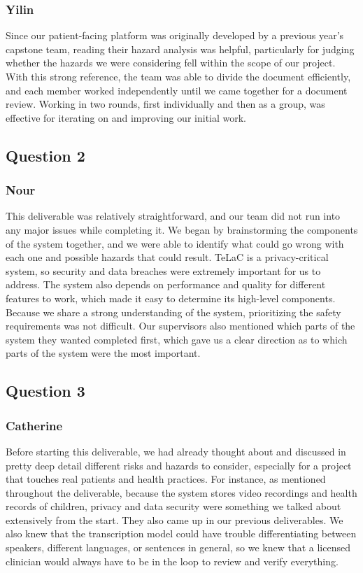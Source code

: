 \documentclass{article}
\begin{document}
\subsubsection*{Yilin}
Since our patient-facing platform was originally developed by a previous year’s capstone team, 
reading their hazard analysis was helpful, particularly for judging whether the hazards we were considering fell within the scope of our project. With this strong reference, 
the team was able to divide the document efficiently, and each member worked independently until we came together 
for a document review. Working in two rounds, first individually and then as a group, was effective for iterating on and improving our initial work.

\subsection*{Question 2}
\subsubsection*{Nour}
This deliverable was relatively straightforward, and our team did not run into any major issues while completing it. 
We began by brainstorming the components of the system together, and we were able to identify what could go wrong with each one and possible hazards that could result. 
TeLaC is a privacy-critical system, so security and data breaches were extremely important for us to address. 
The system also depends on performance and quality for different features to work, which made it easy to determine its high-level components. 
Because we share a strong understanding of the system, prioritizing the safety requirements was not difficult. 
Our supervisors also mentioned which parts of the system they wanted completed first, which gave us a clear direction as to which parts of the system were the most important.

\subsection*{Question 3}
\subsubsection*{Catherine}
Before starting this deliverable, we had already thought about and discussed in pretty
deep detail different risks and hazards to consider, especially for a project that touches
real patients and health practices. For instance, as mentioned throughout the deliverable,
because the system stores video recordings and health records of children, privacy and 
data security were something we talked about extensively from the start. They also 
came up in our previous deliverables. We also knew that the transcription model could
have trouble differentiating between speakers, different languages, or sentences in general,
so we knew that a licensed clinician would always have to be in the loop to review
and verify everything.
\end{document}
